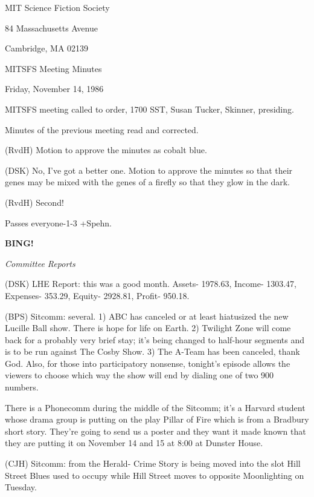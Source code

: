 \documentclass[12pt]{article}
\newcommand{\bing}{{\bf BING!} }
\newcommand{\goto}[1]{\bing \vskip 12pt \centerline{{\em{#1}}}}
\begin{document}
\begin{center}

MIT Science Fiction Society 

84 Massachusetts Avenue

Cambridge, MA 02139

\vspace{12pt}

MITSFS Meeting Minutes 

Friday, November 14, 1986

\end{center}
 
\vspace{18pt}

\setlength{\parskip}{6pt}

\noindent
MITSFS meeting called to order, 1700 SST,
Susan Tucker, Skinner, presiding.

Minutes of the previous meeting read and corrected.

(RvdH) Motion to approve the minutes as cobalt blue.

(DSK) No, I've got a better one. Motion to approve the minutes so that their genes may be mixed with the genes of a firefly so that they glow in the dark.

(RvdH) Second!

Passes everyone-1-3 +Spehn.

\goto{Committee Reports}

(DSK) LHE Report: this was a good month. Assets- 1978.63, Income- 1303.47, Expenses- 353.29, Equity- 2928.81, Profit- 950.18.

(BPS) Sitcomm: several. 1) ABC has canceled or at least hiatusized the new Lucille Ball show. There is hope for life on Earth. 2) Twilight Zone will come back for a probably very brief stay; it's being changed to half-hour segments and is to be run against The Cosby Show. 3) The A-Team has been canceled, thank God. Also, for those into participatory nonsense, tonight's episode allows the viewers to choose which way the show will end by dialing one of two 900 numbers.

There is a Phonecomm during the middle of the Sitcomm; it's a Harvard student whose drama group is putting on the play Pillar of Fire which is from a Bradbury short story. They're going to send us a poster and they want it made known that they are putting it on November 14 and 15 at 8:00 at Dunster House.

(CJH) Sitcomm: from the Herald- Crime Story is being moved into the slot Hill Street Blues used to occupy while Hill Street moves to opposite Moonlighting on Tuesday.
\end{document}

